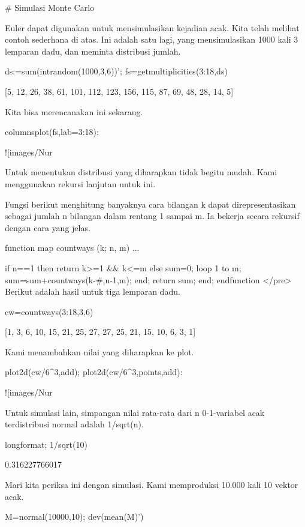 \documentclass{article}
\begin{document}
# Simulasi Monte Carlo

Euler dapat digunakan untuk mensimulasikan kejadian acak. Kita telah
melihat contoh sederhana di atas. Ini adalah satu lagi, yang
mensimulasikan 1000 kali 3 lemparan dadu, dan meminta distribusi
jumlah.


\>ds:=sum(intrandom(1000,3,6))';  fs=getmultiplicities(3:18,ds)


    [5,  12,  26,  38,  61,  101,  112,  123,  156,  115,  87,  69,  48,
    28,  14,  5]

Kita bisa merencanakan ini sekarang.


\>columnsplot(fs,lab=3:18):


![images/Nur%

Untuk menentukan distribusi yang diharapkan tidak begitu mudah. Kami
menggunakan rekursi lanjutan untuk ini.


Fungsi berikut menghitung banyaknya cara bilangan k dapat
direpresentasikan sebagai jumlah n bilangan dalam rentang 1 sampai m.
Ia bekerja secara rekursif dengan cara yang jelas.


\>function map countways (k; n, m) ...


      if n==1 then return k>=1 && k<=m
      else
        sum=0; 
        loop 1 to m; sum=sum+countways(k-#,n-1,m); end;
        return sum;
      end;
    endfunction
</pre>
Berikut adalah hasil untuk tiga lemparan dadu.


\>cw=countways(3:18,3,6)


    [1,  3,  6,  10,  15,  21,  25,  27,  27,  25,  21,  15,  10,  6,  3,
    1]

Kami menambahkan nilai yang diharapkan ke plot.


\>plot2d(cw/6^3,\>add); plot2d(cw/6^3,\>points,\>add):


![images/Nur%

Untuk simulasi lain, simpangan nilai rata-rata dari n 0-1-variabel
acak terdistribusi normal adalah 1/sqrt(n).


\>longformat; 1/sqrt(10)


    0.316227766017

Mari kita periksa ini dengan simulasi. Kami memproduksi 10.000 kali 10
vektor acak.


\>M=normal(10000,10); dev(mean(M)')
\end{document}
